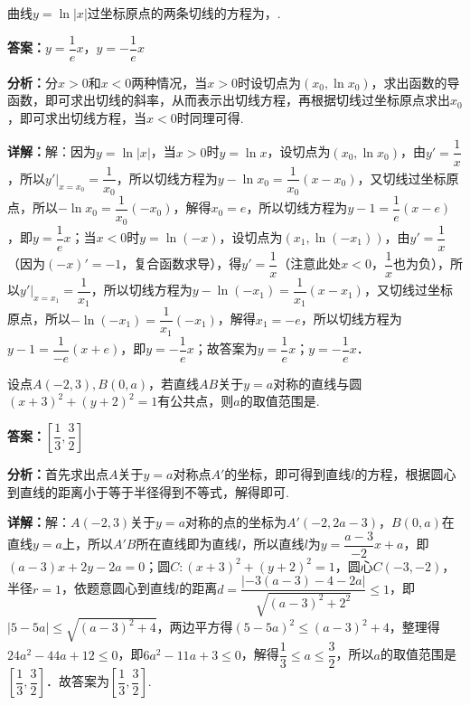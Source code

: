 \begin{question}[points=5]
曲线$y=\ln|x|$过坐标原点的两条切线的方程为，.
\fillin[{$y=\dfrac{1}{e}x$，$y=-\dfrac{1}{e}x$}]
\begin{solution}
\textbf{答案：}$y=\dfrac{1}{e}x$，$y=-\dfrac{1}{e}x$

\textbf{分析：}分$x>0$和$x<0$两种情况，当$x>0$时设切点为$(x_0,\ln x_0)$，求出函数的导函数，即可求出切线的斜率，从而表示出切线方程，再根据切线过坐标原点求出$x_0$，即可求出切线方程，当$x<0$时同理可得.

\textbf{详解：}解：因为$y=\ln|x|$，当$x>0$时$y=\ln x$，设切点为$(x_0,\ln x_0)$，由$y'=\dfrac{1}{x}$，所以$y'|_{x=x_0}=\dfrac{1}{x_0}$，所以切线方程为$y-\ln x_0=\dfrac{1}{x_0}(x-x_0)$，又切线过坐标原点，所以$-\ln x_0=\dfrac{1}{x_0}(-x_0)$，解得$x_0=e$，所以切线方程为$y-1=\dfrac{1}{e}(x-e)$，即$y=\dfrac{1}{e}x$；当$x<0$时$y=\ln(-x)$，设切点为$(x_1,\ln(-x_1))$，由$y'=\dfrac{1}{x}$（因为$(-x)'=-1$，复合函数求导），得$y'=\dfrac{1}{x}$（注意此处$x<0$，$\dfrac{1}{x}$也为负），所以$y'|_{x=x_1}=\dfrac{1}{x_1}$，所以切线方程为$y-\ln(-x_1)=\dfrac{1}{x_1}(x-x_1)$，又切线过坐标原点，所以$-\ln(-x_1)=\dfrac{1}{x_1}(-x_1)$，解得$x_1=-e$，所以切线方程为$y-1=\dfrac{1}{-e}(x+e)$，即$y=-\dfrac{1}{e}x$；故答案为$y=\dfrac{1}{e}x$；$y=-\dfrac{1}{e}x$．
\end{solution}
\end{question}

\begin{question}[points=5]
设点$A(-2,3),B(0,a)$，若直线$AB$关于$y=a$对称的直线与圆$(x+3)^2+(y+2)^2=1$有公共点，则$a$的取值范围是.
\begin{solution}
\textbf{答案：}$\left[\dfrac{1}{3},\dfrac{3}{2}\right]$

\textbf{分析：}首先求出点$A$关于$y=a$对称点$A'$的坐标，即可得到直线$l$的方程，根据圆心到直线的距离小于等于半径得到不等式，解得即可.

\textbf{详解：}解：$A(-2,3)$关于$y=a$对称的点的坐标为$A'(-2,2a-3)$，$B(0,a)$在直线$y=a$上，所以$A'B$所在直线即为直线$l$，所以直线$l$为$y=\dfrac{a-3}{-2}x+a$，即$(a-3)x+2y-2a=0$；圆$C:(x+3)^2+(y+2)^2=1$，圆心$C(-3,-2)$，半径$r=1$，依题意圆心到直线$l$的距离$d=\dfrac{|-3(a-3)-4-2a|}{\sqrt{(a-3)^2+2^2}}\leq 1$，即$|5-5a|\leq\sqrt{(a-3)^2+4}$，两边平方得$(5-5a)^2\leq (a-3)^2+4$，整理得$24a^2-44a+12\leq 0$，即$6a^2-11a+3\leq 0$，解得$\dfrac{1}{3}\leq a\leq \dfrac{3}{2}$，所以$a$的取值范围是$\left[\dfrac{1}{3},\dfrac{3}{2}\right]$．故答案为$\left[\dfrac{1}{3},\dfrac{3}{2}\right]$.
\end{solution}
\end{question}

